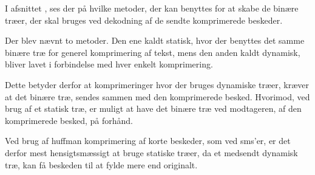 I afsnittet , ses der på hvilke metoder, der kan benyttes for at skabe de binære træer, der skal bruges ved dekodning af de sendte komprimerede beskeder.

Der blev nævnt to metoder. Den ene kaldt statisk, hvor der benyttes det samme binære træ for generel komprimering af tekst, mens den anden kaldt dynamisk, bliver lavet i forbindelse med hver enkelt komprimering.

Dette betyder derfor at komprimeringer hvor der bruges dynamiske træer, kræver at det binære træ, sendes sammen med den komprimerede besked. Hvorimod, ved brug af et statisk træ, er muligt at have det binære træ ved modtageren, af den komprimerede besked, på forhånd.

Ved brug af huffman komprimering af korte beskeder, som ved sms’er, er det derfor mest hensigtsmæssigt at bruge statiske træer, da et medsendt dynamisk træ, kan få beskeden til at fylde mere end originalt.
